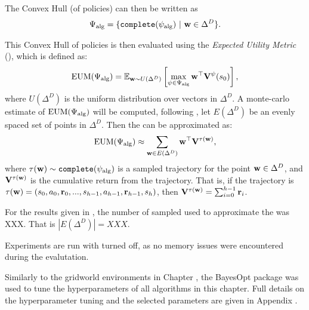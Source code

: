        The Convex Hull (of policies) can then be written as 
        \begin{align}
            \Psi_{\text{alg}} = \{\texttt{complete}(\psi_{\text{alg}})\ |\ \bff{w}\in\Delta^D \}.
        \end{align}

        This Convex Hull of policies is then evaluated using the \textit{Expected Utility Metric} (\eum), which is defined as:
        \begin{align}
            {\textnormal{EUM}}(\Psi_{\text{alg}}) = \mathbb{E}_{\mathbf{w}\sim U(\Delta^D)}\left[
                \max_{\psi\in\Psi_{\text{alg}}} \mathbf{w}^\top \mathbf{V}^{\psi}(s_0)
             \right],
        \end{align}
        where $U(\Delta^D)$ is the uniform distribution over vectors in $\Delta^D$. A monte-carlo estimate of ${\textnormal{EUM}}(\Psi_{\text{alg}})$ will be computed, following , let $E(\Delta^D)$ be an evenly spaced set of points in $\Delta^D$. Then the \eum\ewe can be approximated as:
        \begin{align}
            {\textnormal{EUM}}(\Psi_{\text{alg}}) \approx \sum_{\mathbf{w}\in E(\Delta^D)} \mathbf{w}^\top \mathbf{V}^{\tau(\mathbf{w})},
        \end{align}
        where $\tau(\mathbf{w}) \sim \texttt{complete}(\psi_{\text{alg}})$ is a sampled trajectory for the point $\mathbf{w}\in\Delta^D$, and $\mathbf{V}^{\tau(\mathbf{w})}$ is the cumulative return from the trajectory. That is, if  the trajectory is $\tau(\mathbf{w})=(s_0,a_0,\mathbf{r}_0,...,s_{h-1},a_{h-1},\mathbf{r}_{h-1},s_h)$, then $\mathbf{V}^{\tau(\mathbf{w})} = \sum_{i=0}^{h-1} \mathbf{r}_i$.

        For the results given in , the number of sampled used to approximate the \eum\ewe was XXX. That is $|E(\Delta^D)| = XXX$.


        Experiments are run with \mctsmode\ewe turned off, as no memory issues were encountered during the evalutation.

        Similarly to the gridworld environments in Chapter , the BayesOpt package \cite{bayesopt} was used to tune the hyperparameters of all algorithms in this chapter. Full details on the hyperparameter tuning and the selected parameters are given in Appendix .



